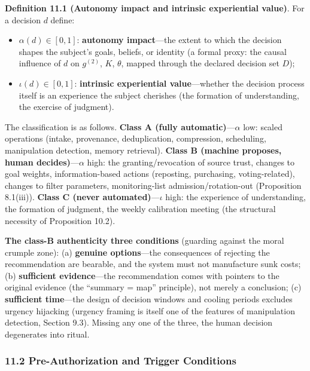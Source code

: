 \documentclass[
  11pt]{article}
\providecommand{\tightlist}{%
  \setlength{\itemsep}{0pt}\setlength{\parskip}{0pt}}
\begin{document}
\textbf{Definition 11.1 (Autonomy impact and intrinsic experiential
value)}. For a decision \(d\) define:

\begin{itemize}
\tightlist
\item
  \(\alpha(d) \in [0,1]\): \textbf{autonomy impact}---the extent to
  which the decision shapes the subject's goals, beliefs, or identity (a
  formal proxy: the causal influence of \(d\) on \(g^{(2)}\), \(K\),
  \(\theta\), mapped through the declared decision set \(D\));
\item
  \(\iota(d) \in [0,1]\): \textbf{intrinsic experiential
  value}---whether the decision process itself is an experience the
  subject cherishes (the formation of understanding, the exercise of
  judgment).
\end{itemize}

The classification is as follows. \textbf{Class A (fully
automatic)}---\(\alpha\) low: scaled operations (intake, provenance,
deduplication, compression, scheduling, manipulation detection, memory
retrieval). \textbf{Class B (machine proposes, human
decides)}---\(\alpha\) high: the granting/revocation of source trust,
changes to goal weights, information-based actions (reposting,
purchasing, voting-related), changes to filter parameters,
monitoring-list admission/rotation-out (Proposition 8.1(iii)).
\textbf{Class C (never automated)}---\(\iota\) high: the experience of
understanding, the formation of judgment, the weekly calibration meeting
(the structural necessity of Proposition 10.2).

\textbf{The class-B authenticity three conditions} (guarding against the
moral crumple zone): (a) \textbf{genuine options}---the consequences of
rejecting the recommendation are bearable, and the system must not
manufacture sunk costs; (b) \textbf{sufficient evidence}---the
recommendation comes with pointers to the original evidence (the
``summary = map'' principle), not merely a conclusion; (c)
\textbf{sufficient time}---the design of decision windows and cooling
periods excludes urgency hijacking (urgency framing is itself one of the
features of manipulation detection, Section 9.3). Missing any one of the
three, the human decision degenerates into ritual.

\subsubsection{11.2 Pre-Authorization and Trigger
Conditions}\label{pre-authorization-and-trigger-conditions}
\end{document}
